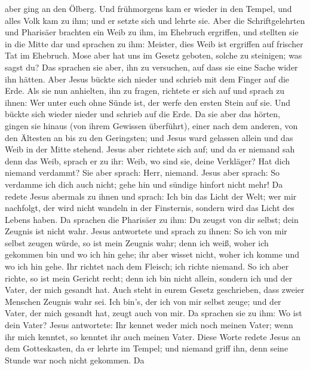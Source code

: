 aber ging an den Ölberg.  Und frühmorgens kam er wieder in
den Tempel, und alles Volk kam zu ihm; und er setzte sich und lehrte
sie.  Aber die Schriftgelehrten und Pharisäer brachten ein
Weib zu ihm, im Ehebruch ergriffen, und stellten sie in die Mitte dar
 und sprachen zu ihm: Meister, dies Weib ist ergriffen auf
frischer Tat im Ehebruch.  Mose aber hat uns im Gesetz
geboten, solche zu steinigen; was sagst du?  Das sprachen
sie aber, ihn zu versuchen, auf dass sie eine Sache wider ihn hätten.
Aber Jesus bückte sich nieder und schrieb mit dem Finger auf die Erde.
 Als sie nun anhielten, ihn zu fragen, richtete er sich auf
und sprach zu ihnen: Wer unter euch ohne Sünde ist, der werfe den ersten
Stein auf sie.  Und bückte sich wieder nieder und schrieb
auf die Erde.  Da sie aber das hörten, gingen sie hinaus
(von ihrem Gewissen überführt), einer nach dem anderen, von den Ältesten
an bis zu den Geringsten; und Jesus ward gelassen allein und das Weib in
der Mitte stehend.  Jesus aber richtete sich auf; und da er
niemand sah denn das Weib, sprach er zu ihr: Weib, wo sind sie, deine
Verkläger? Hat dich niemand verdammt?  Sie aber sprach:
Herr, niemand. Jesus aber sprach: So verdamme ich dich auch nicht; gehe
hin und sündige hinfort nicht mehr!  Da redete Jesus
abermals zu ihnen und sprach: Ich bin das Licht der Welt; wer mir
nachfolgt, der wird nicht wandeln in der Finsternis, sondern wird das
Licht des Lebens haben.  Da sprachen die Pharisäer zu ihm:
Du zeugst von dir selbst; dein Zeugnis ist nicht wahr. 
Jesus antwortete und sprach zu ihnen: So ich von mir selbst zeugen
würde, so ist mein Zeugnis wahr; denn ich weiß, woher ich gekommen bin
und wo ich hin gehe; ihr aber wisset nicht, woher ich komme und wo ich
hin gehe.  Ihr richtet nach dem Fleisch; ich richte
niemand.  So ich aber richte, so ist mein Gericht recht;
denn ich bin nicht allein, sondern ich und der Vater, der mich gesandt
hat.  Auch steht in eurem Gesetz geschrieben, dass zweier
Menschen Zeugnis wahr sei.  Ich bin's, der ich von mir
selbst zeuge; und der Vater, der mich gesandt hat, zeugt auch von mir.
 Da sprachen sie zu ihm: Wo ist dein Vater? Jesus
antwortete: Ihr kennet weder mich noch meinen Vater; wenn ihr mich
kenntet, so kenntet ihr auch meinen Vater.  Diese Worte
redete Jesus an dem Gotteskasten, da er lehrte im Tempel; und niemand
griff ihn, denn seine Stunde war noch nicht gekommen.  Da
